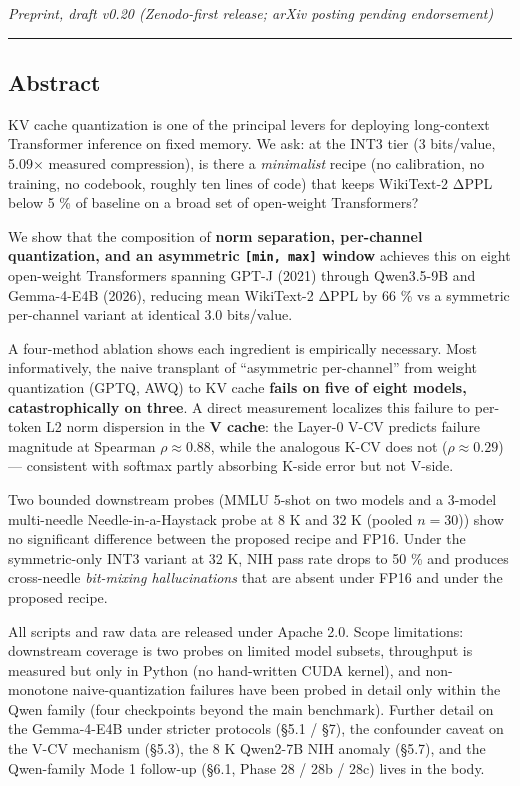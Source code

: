 \emph{Preprint, draft v0.20 (Zenodo-first release; arXiv posting pending
endorsement)}

\begin{center}\rule{0.5\linewidth}{0.5pt}\end{center}

\subsection{Abstract}\label{abstract}

KV cache quantization is one of the principal levers for deploying
long-context Transformer inference on fixed memory. We ask: at the INT3
tier (3 bits/value, 5.09× measured compression), is there a
\emph{minimalist} recipe (no calibration, no training, no codebook,
roughly ten lines of code) that keeps WikiText-2 ΔPPL below 5 \% of
baseline on a broad set of open-weight Transformers?

We show that the composition of \textbf{norm separation, per-channel
quantization, and an asymmetric \texttt{{[}min,\ max{]}} window}
achieves this on eight open-weight Transformers spanning GPT-J (2021)
through Qwen3.5-9B and Gemma-4-E4B (2026), reducing mean WikiText-2 ΔPPL
by 66 \% vs a symmetric per-channel variant at identical 3.0 bits/value.

A four-method ablation shows each ingredient is empirically necessary.
Most informatively, the naive transplant of ``asymmetric per-channel''
from weight quantization (GPTQ, AWQ) to KV cache \textbf{fails on five
of eight models, catastrophically on three}. A direct measurement
localizes this failure to per-token L2 norm dispersion in the \textbf{V
cache}: the Layer-0 V-CV predicts failure magnitude at Spearman
\(\rho \approx 0.88\), while the analogous K-CV does not
(\(\rho \approx 0.29\)) --- consistent with softmax partly absorbing
K-side error but not V-side.

Two bounded downstream probes (MMLU 5-shot on two models and a 3-model
multi-needle Needle-in-a-Haystack probe at 8 K and 32 K (pooled
\(n = 30\))) show no significant difference between the proposed recipe
and FP16. Under the symmetric-only INT3 variant at 32 K, NIH pass rate
drops to 50 \% and produces cross-needle \emph{bit-mixing
hallucinations} that are absent under FP16 and under the proposed
recipe.

All scripts and raw data are released under Apache 2.0. Scope
limitations: downstream coverage is two probes on limited model subsets,
throughput is measured but only in Python (no hand-written CUDA kernel),
and non-monotone naive-quantization failures have been probed in detail
only within the Qwen family (four checkpoints beyond the main
benchmark). Further detail on the Gemma-4-E4B under stricter protocols
(§5.1 / §7), the confounder caveat on the V-CV mechanism (§5.3), the 8 K
Qwen2-7B NIH anomaly (§5.7), and the Qwen-family Mode 1 follow-up (§6.1,
Phase 28 / 28b / 28c) lives in the body.

